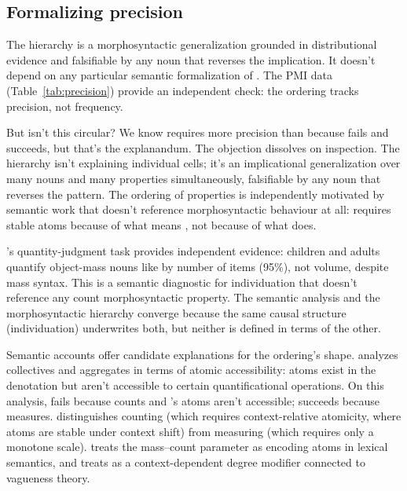 \documentclass[12pt,a4paper]{article}
\begin{document}
\subsection{Formalizing precision}\label{sec:precision-formal}

The hierarchy is a morphosyntactic generalization grounded in distributional evidence and falsifiable by any noun that reverses the implication. It doesn't depend on any particular semantic formalization of . The PMI data (Table~\ref{tab:precision}) provide an independent check: the ordering tracks precision, not frequency.

But isn't this circular? We know  requires more precision than  because  fails and  succeeds, but that's the explanandum. The objection dissolves on inspection. The hierarchy isn't explaining individual cells; it's an implicational generalization over many nouns and many properties simultaneously, falsifiable by any noun that reverses the pattern. The ordering of properties is independently motivated by semantic work that doesn't reference morphosyntactic behaviour at all:  requires stable atoms because of what  means \citep{rothstein2010,grimm2018}, not because of what  does.

\textcite{barner2005}'s quantity-judgment task provides independent evidence: children and adults quantify object-mass nouns like  by number of items (95\%), not volume, despite mass syntax. This is a semantic diagnostic for individuation that doesn't reference any count morphosyntactic property. The semantic analysis and the morphosyntactic hierarchy converge because the same causal structure (individuation) underwrites both, but neither is defined in terms of the other.

Semantic accounts offer candidate explanations for the ordering's shape. \textcite{grimm2018} analyzes collectives and aggregates in terms of atomic accessibility: atoms exist in the denotation but aren't accessible to certain quantificational operations. On this analysis,  fails because  counts and 's atoms aren't accessible;  succeeds because  measures. \textcite{rothstein2010} distinguishes counting (which requires context-relative atomicity, where atoms are stable under context shift) from measuring (which requires only a monotone scale). \textcite{chierchia1998} treats the mass--count parameter as encoding atoms in lexical semantics, and \textcite{hackl2000} treats  as a context-dependent degree modifier connected to vagueness theory.
\end{document}
